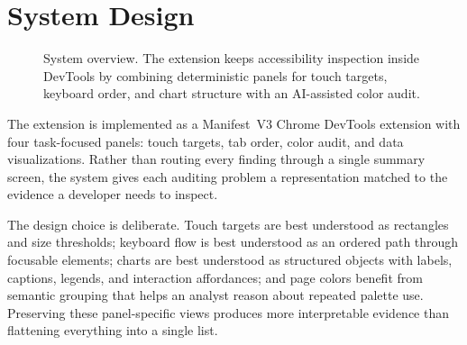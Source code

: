 \section{System Design}
\label{sec:system}

\begin{figure}[t]
  \centering
  \caption{System overview. The extension keeps accessibility inspection inside DevTools by combining deterministic panels for touch targets, keyboard order, and chart structure with an AI-assisted color audit.}
  \label{fig:architecture}
\end{figure}

The extension is implemented as a Manifest~V3 Chrome DevTools extension with four task-focused panels: touch targets, tab order, color audit, and data visualizations. Rather than routing every finding through a single summary screen, the system gives each auditing problem a representation matched to the evidence a developer needs to inspect.

The design choice is deliberate. Touch targets are best understood as rectangles and size thresholds; keyboard flow is best understood as an ordered path through focusable elements; charts are best understood as structured objects with labels, captions, legends, and interaction affordances; and page colors benefit from semantic grouping that helps an analyst reason about repeated palette use. Preserving these panel-specific views produces more interpretable evidence than flattening everything into a single list.

